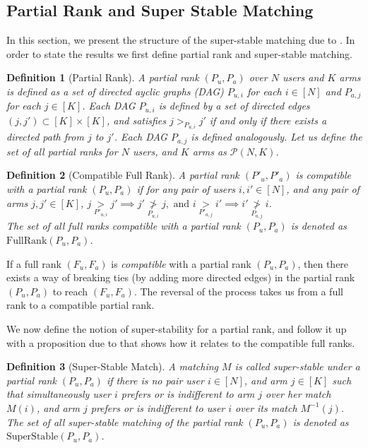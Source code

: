 \documentclass{article}
\newtheorem{definition}{Definition}
\begin{document}
\subsection{Partial Rank and Super Stable Matching}
In this section, we present the structure of the super-stable matching due to \cite{spieker1995set}. In order to state the results we first define partial rank and super-stable matching. 
\begin{definition}[Partial Rank]
    A partial rank $(P_{u}, P_{a})$ over $N$ users and $K$ arms is defined as a set of directed ayclic graphs (DAG) $P_{u,i}$ for each $i \in [N]$ and $P_{a,j}$ for each $j \in [K]$. Each DAG $P_{u,i}$ is defined by a set of directed edges $(j, j') \subset [K]\times [K]$, and satisfies $j >_{P_{u,i}} j'$ {\em if and only if} there exists a directed path from $j$ to $j'$. Each DAG $P_{a,j}$ is defined analogously. Let us define the set of all partial ranks for $N$ users, and $K$ arms as $\mathcal{P}(N, K)$.
\end{definition}
\begin{definition}[Compatible Full Rank]
    A partial rank $(P'_{u}, P'_{a})$ is {\em compatible} with a partial rank $(P_{u}, P_{a})$ if for any pair of users $i, i' \in [N]$, and any pair of arms $j, j' \in [K]$, 
    $
    j \underset{P'_{u,i}}{>} j' \implies j' \underset{P_{u,i}}{\not>} j, \text{ and } i \underset{P'_{a,j}}{>} i' \implies i' \underset{P_{a,j}}{\not>} i.
    $\\
    The set of all full ranks {\em compatible} with a partial rank $(P_{u}, P_{a})$ is denoted as $\mathrm{FullRank}(P_{u}, P_{a})$.
\end{definition}
If a full rank $(F_{u}, F_{a})$ is {\em compatible} with a partial rank $(P_{u}, P_{a})$, then there exists a way of breaking ties (by adding more directed edges) in the partial rank $(P_{u}, P_{a})$ to reach $(F_{u}, F_{a})$. The reversal of the process takes us from a full rank to a compatible partial rank. 

We now define the notion of super-stability for a partial rank, and follow it up with a proposition due to \cite{spieker1995set} that shows how it relates to the compatible full ranks. 
\begin{definition}[Super-Stable Match]
    A matching $M$ is called super-stable under a partial rank $(P_{u}, P_{a})$ if there is no pair user $i \in [N]$, and arm $j \in [K]$ such that simultaneously user $i$ prefers {\em or is indifferent to} arm $j$ over her match $M(i)$, and arm $j$ prefers {\em or is indifferent to} user $i$ over its match $M^{-1}(j)$. The set of all super-stable matching of the partial rank $(P_{u}, P_{a})$ is denoted as $\mathrm{SuperStable}(P_{u}, P_{a})$.
\end{definition}
\end{document}
